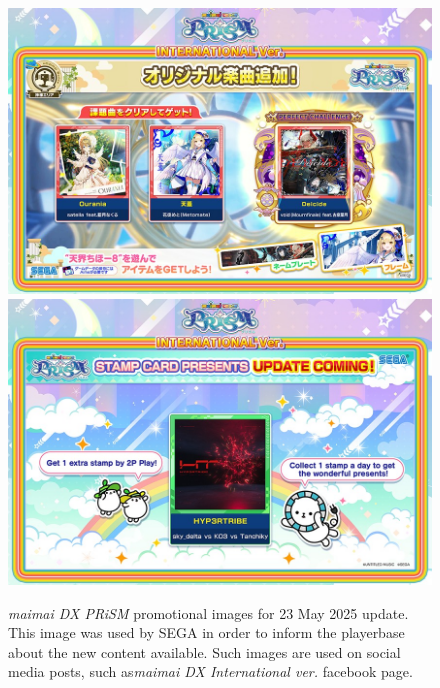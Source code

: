 \begin{figure}[h]
    \centering\includegraphics[scale=0.255]{obrazki/maimaiupdate1.jpg}
    \centering\includegraphics[scale=0.255]{obrazki/maimaiupdate2.jpg}
    \caption{\textit{maimai DX PRiSM} promotional images for 23 May 2025 update. This image was used by SEGA in order to inform the playerbase about the new content available. Such images are used on social media posts, such as\textit{maimai DX International ver.} facebook page. \cite{maifb}}
    \label{fig:maimaiupdates}
\end{figure}

